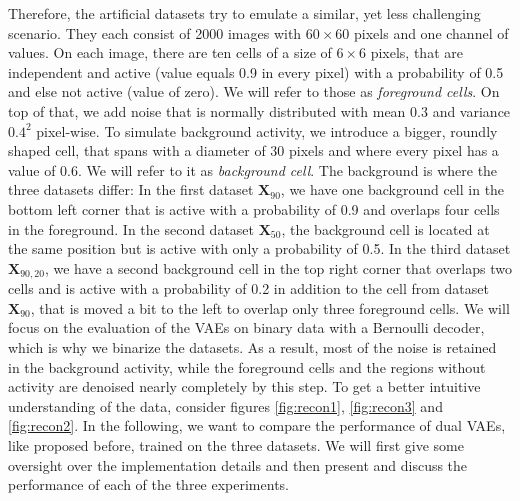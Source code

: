 \documentclass[12pt]{report}
\theoremstyle{definition}
\begin{document}
Therefore, the artificial datasets try to emulate a similar, yet less challenging scenario. They each consist of 2000 images with $60 \times 60$ pixels and one channel of values. On each image, there are ten cells of a size of $6 \times 6$ pixels, that are independent and active (value equals 0.9 in every pixel) with a probability of 0.5 and else not active (value of zero).  We will refer to those as \emph{foreground cells}. On top of that, we add noise that is normally distributed with mean $0.3$ and variance $0.4^2$ pixel-wise. To simulate background activity, we introduce a bigger, roundly shaped cell, that spans with a diameter of 30 pixels and where every pixel has a value of 0.6. We will refer to it as \emph{background cell}. The background is where the three datasets differ: In the first dataset $\mathbf{X}_{90}$, we have one background cell in the bottom left corner that is active with a probability of 0.9 and overlaps four cells in the foreground. In the second dataset $\mathbf{X}_{50}$, the background cell is located at the same position but is active with only a probability of 0.5. In the third dataset $\mathbf{X}_{90, 20}$, we have a second background cell in the top right corner that overlaps two cells and is active with a probability of 0.2 in addition to the cell from dataset $\mathbf{X}_{90}$, that is moved a bit to the left to overlap only three foreground cells. We will focus on the evaluation of the VAEs on binary data with a Bernoulli decoder, which is why we binarize the datasets. As a result, most of the noise is retained in the background activity, while the foreground cells and the regions without activity are denoised nearly completely by this step. To get a better intuitive understanding of the data, consider figures \ref{fig:recon1}, \ref{fig:recon3} and \ref{fig:recon2}. In the following, we want to compare the performance of dual VAEs, like proposed before, trained on the three datasets. We will first give some oversight over the implementation details and then present and discuss the performance of each of the three experiments.
\end{document}

